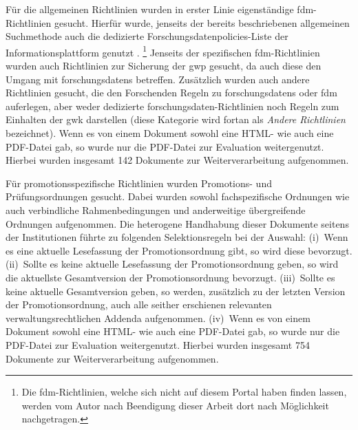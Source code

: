 Für die allgemeinen Richtlinien wurden in erster Linie eigenständige \gls{fdm}-Richt\-linien gesucht.
Hierfür wurde, jenseits der bereits beschriebenen allgemeinen Suchmethode auch die dedizierte Forschungsdatenpolicies-Liste der Informationsplattform \citeauthor{Forschungsdaten2024} genutzt \autocite{Forschungsdaten2024}.%
\footnote{%
    Die \gls{fdm}-Richtlinien, welche sich nicht auf diesem Portal haben finden lassen, werden vom Autor nach Beendigung dieser Arbeit dort nach Möglichkeit nachgetragen.%
}
Jenseits der spezifischen \gls{fdm}-Richtlinien wurden auch Richtlinien zur Sicherung der \gls{gwp} gesucht, da auch diese den Umgang mit \glspl{forschungsdaten} betreffen.
Zusätzlich wurden auch andere Richtlinien gesucht, die den Forschenden Regeln zu \glspl{forschungsdaten} oder \gls{fdm} auferlegen, aber weder dedizierte \gls{forschungsdaten}-Richtlinien noch Regeln zum Einhalten der \gls{gwk} darstellen (diese Kategorie wird fortan als \textit{Andere Richtlinien} bezeichnet).
Wenn es von einem Dokument sowohl eine HTML- wie auch eine PDF-Datei gab, so wurde nur die PDF-Datei zur Evaluation weitergenutzt.
Hierbei wurden insgesamt \num{142} Dokumente zur Weiterverarbeitung aufgenommen.

Für promotionsspezifische Richtlinien wurden Promotions- und Prüfungsordnungen gesucht.
Dabei wurden sowohl fachspezifische Ordnungen wie auch verbindliche Rahmenbedingungen und anderweitige übergreifende Ordnungen aufgenommen.
Die heterogene Handhabung dieser Dokumente seitens der Institutionen führte zu folgenden Selektionsregeln bei der Auswahl:
(i)~Wenn es eine aktuelle Lesefassung der Promotionsordnung gibt, so wird diese bevorzugt.
(ii)~Sollte es keine aktuelle Lesefassung der Promotionsordnung geben, so wird die aktuellste Gesamtversion der Promotionsordnung bevorzugt.
(iii)~Sollte es keine aktuelle Gesamtversion geben, so werden, zusätzlich zu der letzten Version der Promotionsordnung, auch alle seither erschienen relevanten verwaltungsrechtlichen Addenda aufgenommen.
(iv)~Wenn es von einem Dokument sowohl eine HTML- wie auch eine PDF-Datei gab, so wurde nur die PDF-Datei zur Evaluation weitergenutzt.
Hierbei wurden insgesamt \num{754} Dokumente zur Weiterverarbeitung aufgenommen.

